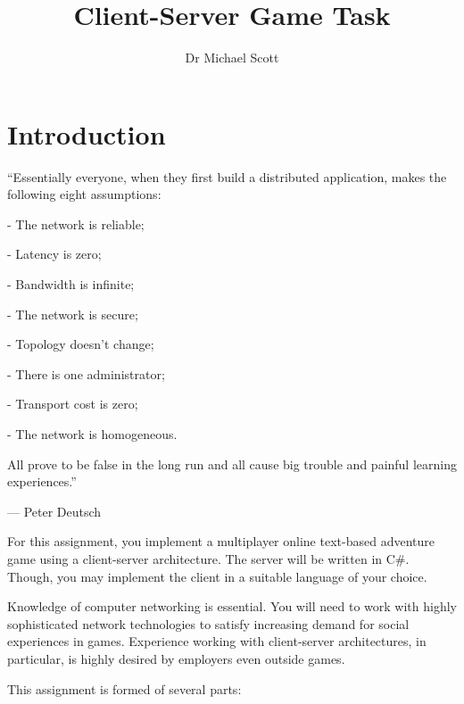 \documentclass{../../fal_assignment}
\title{Client-Server Game Task}
\author{Dr Michael Scott}
\begin{document}
\maketitle

\section*{Introduction}

\begin{marginquote}
``Essentially everyone, when they first build a distributed application, makes the following eight assumptions:

\par - The network is reliable;
\par - Latency is zero;
\par - Bandwidth is infinite;
\par - The network is secure;
\par - Topology doesn't change;
\par - There is one administrator;
\par - Transport cost is zero;
\par - The network is homogeneous.

All prove to be false in the long run and all cause big trouble and painful learning experiences.''

\par --- Peter Deutsch
\end{marginquote}

For this assignment, you implement a multiplayer online text-based adventure game using a client-server architecture.  The server will be written in C\#. Though, you may implement the client in a suitable language of your choice. 

Knowledge of computer networking is essential. You will need to work with highly sophisticated network technologies to satisfy increasing demand for social experiences in games. Experience working with client-server architectures, in particular, is highly desired by employers even outside games.

This assignment is formed of several parts:
\end{document}
